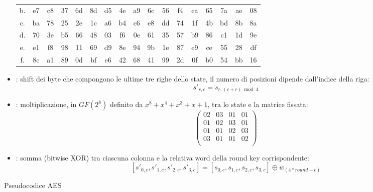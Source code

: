 \documentclass[target=bach,aauheader=,style=]{thud}
\begin{document}
\begin{itemize}
\begin{table}[h!]
\begin{tabular}{|c|cccccccccccccccc|}
						b. & e7 & c8 & 37 & 6d & 8d & d5 & 4e & a9 & 6c & 56 & f4 & ea & 65 & 7a & ae & 08 \\
						c. & ba & 78 & 25 & 2e & 1c & a6 & b4 & c6 & e8 & dd & 74 & 1f & 4b & bd & 8b & 8a \\
						d. & 70 & 3e & b5 & 66 & 48 & 03 & f6 & 0e & 61 & 35 & 57 & b9 & 86 & c1 & 1d & 9e \\
						e. & e1 & f8 & 98 & 11 & 69 & d9 & 8e & 94 & 9b & 1e & 87 & e9 & ce & 55 & 28 & df \\
						f. & 8c & a1 & 89 & 0d & bf & e6 & 42 & 68 & 41 & 99 & 2d & 0f & b0 & 54 & bb & 16 \\
						\hline
					\end{tabular}
				\end{table}
				\item {} : shift dei byte che compongono le ultime tre righe dello state, il numero di posizioni dipende dall'indice della riga:
				\[s'_{r,c} = s_{r,(c+r) \bmod 4}\]
				\item {} : moltiplicazione, in $GF(2^8)$ definito da $x^8+x^4+x^3+x+1$, tra lo state e la matrice fissata:
				\[
				\begin{pmatrix}
					02 & 03 & 01 & 01 \\
					01 & 02 & 03 & 01 \\
					01 & 01 & 02 & 03 \\
					03 & 01 & 01 & 02 \\
				\end{pmatrix}
				\]
				\item {} : somma (bitwise XOR) tra ciascuna colonna e la relativa word della round key corrispondente:
				\[[s'_{0,c},s'_{1,c},s'_{2,c},s'_{3,c}] = [s_{0,c},s_{1,c},s_{2,c},s_{3,c}] \oplus w_{(4*round+c)}\]
			\end{itemize}
			
			\begin{algorithm}
				\caption{Pseudocodice AES}
				\begin{algorithmic}
						\EndFor
					\EndProcedure
				\end{algorithmic}
			\end{algorithm}
			
\end{document}
